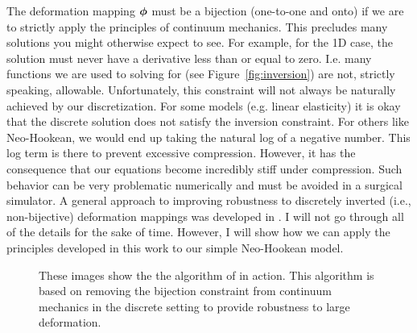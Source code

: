 The deformation mapping $\boldsymbol{\phi}$ must be a bijection (one-to-one and onto) if we are to strictly apply the principles of continuum mechanics. This precludes many solutions you might otherwise expect to see. For example, for the 1D case, the solution must never have a derivative less than or equal to zero. I.e. many functions we are used to solving for (see Figure~\ref{fig:inversion}) are not, strictly speaking, allowable. Unfortunately, this constraint will not always be naturally achieved by our discretization. For some models (e.g. linear elasticity) it is okay that the discrete solution does not satisfy the inversion constraint. For others like Neo-Hookean, we would end up taking the natural log of a negative number. This log term is there to prevent excessive compression. However, it has the consequence that our equations become incredibly stiff under compression. Such behavior can be very problematic numerically and must be avoided in a surgical simulator. A general approach to improving robustness to discretely inverted (i.e., non-bijective) deformation mappings was developed in \cite{Irving06}. I will not go through all of the details for the sake of time. However, I will show how we can apply the principles developed in this work to our simple Neo-Hookean model.

\begin{figure}
\caption{These images show the the algorithm of \cite{Irving06} in action. This algorithm is based on removing the bijection constraint from continuum mechanics in the discrete setting to provide robustness to large deformation.}
\end{figure}

